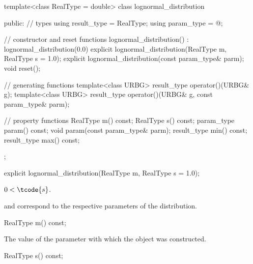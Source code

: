 %
%
\begin{codeblock}
template<class RealType = double>
  class lognormal_distribution {
  public:
    // types
    using result_type = RealType;
    using param_type  = @\unspec@;

    // constructor and reset functions
    lognormal_distribution() : lognormal_distribution(0.0) {}
    explicit lognormal_distribution(RealType m, RealType s = 1.0);
    explicit lognormal_distribution(const param_type& parm);
    void reset();

    // generating functions
    template<class URBG>
      result_type operator()(URBG& g);
    template<class URBG>
      result_type operator()(URBG& g, const param_type& parm);

    // property functions
    RealType m() const;
    RealType s() const;
    param_type param() const;
    void param(const param_type& parm);
    result_type min() const;
    result_type max() const;
  };
\end{codeblock}


%
\begin{itemdecl}
explicit lognormal_distribution(RealType m, RealType s = 1.0);
\end{itemdecl}

\begin{itemdescr}
\pnum
\expects
$0 < \tcode{s}$.

\pnum
\remarks
{} and 
correspond to the respective parameters of the distribution.
\end{itemdescr}

\begin{indexed}{}
\begin{itemdecl}
RealType m() const;
\end{itemdecl}
\end{indexed}

\begin{itemdescr}
\pnum
\returns
The value of the  parameter
 with which the object was constructed.
\end{itemdescr}

\begin{indexed}{}
\begin{itemdecl}
RealType s() const;
\end{itemdecl}
\end{indexed}

